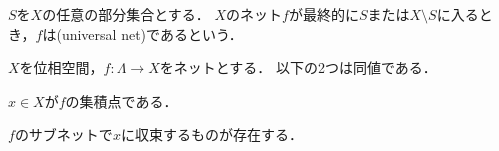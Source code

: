 \documentclass{ltjsbook}
\begin{document}
\begin{thmbox}
\begin{definition}
\(S\)を\(X\)の任意の部分集合とする．
\(X\)のネット\(f\)が最終的に\(S\)または\(X \setminus S\)に入るとき，\(f\)は(universal net)であるという．
\end{definition}
\end{thmbox}

\begin{thmbox}
\begin{theorem}
\(X\)を位相空間，\(f \colon \Lambda \to X\)をネットとする．
以下の2つは同値である．
\begin{conditions}
    \item\label{compact-equiv-cluster} \(x \in X\)が\(f\)の集積点である．
    \item\label{compact-equiv-subnet} \(f\)のサブネットで\(x\)に収束するものが存在する．
\end{conditions}
\end{theorem}
\end{thmbox}
\end{document}
